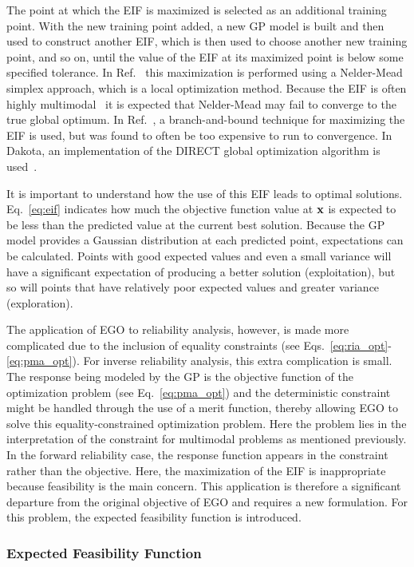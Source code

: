 The point at which the EIF is maximized is selected as an additional training 
point.
With the new training point added, a new GP model is built and then used 
to construct another EIF, which is then used to choose another new training 
point, and so on, until the value of the EIF at its maximized point is below 
some specified tolerance.
In Ref.~\cite{Hua06} this maximization is performed using a Nelder-Mead
simplex approach, which is a local optimization method.
Because the EIF is often highly multimodal~\cite{Jon98} it is expected that 
Nelder-Mead may fail to converge to the true global optimum.
In Ref.~\cite{Jon98}, a branch-and-bound technique for maximizing the EIF
is used, but was found to often be too expensive to run to convergence.
In Dakota, an implementation of the DIRECT global optimization algorithm is 
used~\cite{Gab01}.

It is important to understand how the use of this EIF leads to optimal
solutions.
Eq.~\ref{eq:eif} indicates how much the objective function value at ${\bf x}$ 
is expected to be less than the predicted value at the current best solution. 
Because the GP model provides a Gaussian distribution at each predicted 
point, expectations can be calculated.
Points with good expected values and even a small variance will
have a significant expectation of producing a better solution (exploitation), 
but so will points that have relatively poor expected values and greater 
variance (exploration).

The application of EGO to reliability analysis, however, is made more 
complicated due to the inclusion of equality constraints 
(see Eqs.~\ref{eq:ria_opt}-\ref{eq:pma_opt}).
For inverse reliability analysis, this extra complication is small.
The response being modeled by the GP is the objective function of the optimization 
problem (see Eq.~\ref{eq:pma_opt}) and the deterministic constraint might be handled 
through the use of a merit function, thereby allowing EGO to solve this 
equality-constrained optimization problem.
Here the problem lies in the interpretation of the constraint for multimodal
problems as mentioned previously.
In the forward reliability case, the response function appears in the
constraint rather than the objective.
Here, the maximization of the EIF is inappropriate because feasibility is
the main concern.
This application is therefore a significant departure from the original
objective of EGO and requires a new formulation.
For this problem, the expected feasibility function is introduced.

\subsubsection{Expected Feasibility Function}\label{uq:reliability:global:ego:eff}

